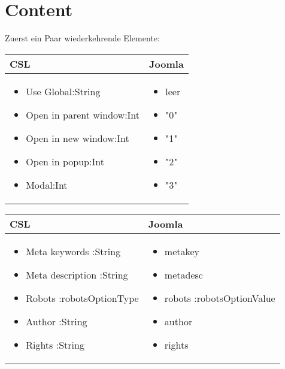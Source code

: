 \chapter{Content}
Zuerst ein Paar wiederkehrende Elemente:

\begin{minipage}{0.7\textwidth}
\begin{tabular}{|p{} | p{}|}
\hline
\textbf{CSL} & \textbf{Joomla} \\ 
\hline
\begin{itemize}
\item Use Global:String
\item Open in parent window:Int
\item Open in new window:Int
\item Open in popup:Int
\item Modal:Int 
\end{itemize}
 & 
\begin{itemize}
\item leer 
\item "0"
\item "1"
\item "2"
\item "3"
\end{itemize}
\\
\hline
\end{tabular}
\end{minipage}

\begin{minipage}{0.7\textwidth}
\begin{tabular}{|p{} | p{}|}
\hline
\textbf{CSL} & \textbf{Joomla} \\ 
\hline
\begin{itemize}
 \item Meta keywords :String 
 \item Meta description :String
 \item Robots :robotsOptionType 
 \item Author :String 
 \item Rights :String 
\end{itemize}
 & 
\begin{itemize}
\item metakey 
\item metadesc 
\item robots :robotsOptionValue 
\item author 
\item rights 
\end{itemize}
\\
\hline
\end{tabular}
\end{minipage}

